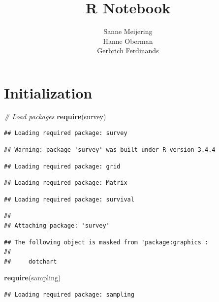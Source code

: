 \documentclass[]{article}
\title{R Notebook}
\author{Sanne Meijering \\ Hanne Oberman \\ Gerbrich Ferdinands}
\date{}
\newenvironment{Shaded}{\begin{snugshade}}{\end{snugshade}}
\newcommand{\KeywordTok}[1]{\textcolor[rgb]{0.13,0.29,0.53}{\textbf{{#1}}}}
\newcommand{\CommentTok}[1]{\textcolor[rgb]{0.56,0.35,0.01}{\textit{{#1}}}}
\newcommand{\NormalTok}[1]{{#1}}
\begin{document}
\maketitle

\section{Initialization}\label{initialization}

\begin{Shaded}
\begin{Highlighting}[]
\CommentTok{# Load packages}
\KeywordTok{require}\NormalTok{(survey)}
\end{Highlighting}
\end{Shaded}

\begin{verbatim}
## Loading required package: survey
\end{verbatim}

\begin{verbatim}
## Warning: package 'survey' was built under R version 3.4.4
\end{verbatim}

\begin{verbatim}
## Loading required package: grid
\end{verbatim}

\begin{verbatim}
## Loading required package: Matrix
\end{verbatim}

\begin{verbatim}
## Loading required package: survival
\end{verbatim}

\begin{verbatim}
## 
## Attaching package: 'survey'
\end{verbatim}

\begin{verbatim}
## The following object is masked from 'package:graphics':
## 
##     dotchart
\end{verbatim}

\begin{Shaded}
\begin{Highlighting}[]
\KeywordTok{require}\NormalTok{(sampling)}
\end{Highlighting}
\end{Shaded}

\begin{verbatim}
## Loading required package: sampling
\end{verbatim}
\end{document}
